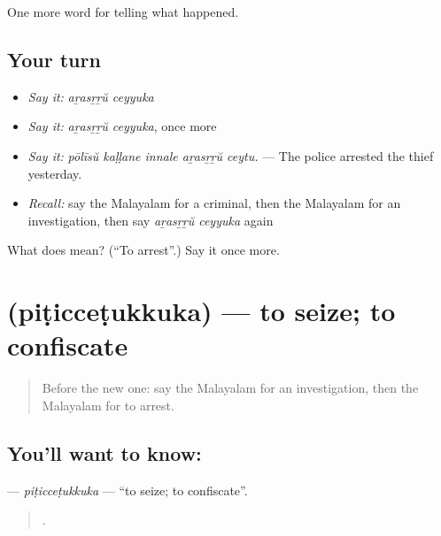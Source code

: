 \begin{grammarlens}[title={What you've built}]
One more word for telling what happened.
\end{grammarlens}

\subsection*{Your turn}
\begin{itemize}
\raggedright
  \item \emph{Say it:} \emph{aṟasṟṟŭ ceyyuka}
  \item \emph{Say it:} \emph{aṟasṟṟŭ ceyyuka}, once more
  \item \emph{Say it:} \emph{pōlīsŭ kaḷḷane innale aṟasṟṟŭ ceytu.} — The police arrested the thief yesterday.
  \item \emph{Recall:} say the Malayalam for a criminal, then the Malayalam for an investigation, then say \emph{aṟasṟṟŭ ceyyuka} again
\end{itemize}

\begin{tcolorbox}[breakable,colback=teal!4,colframe=teal!35!black,title={Before you move on}]
What does   mean? (\textquotedblleft{}To arrest\textquotedblright{}.) Say it once more.
\end{tcolorbox}
\section[\texorpdfstring{\ml{പിടിച്ചെടുക്കുക} (piṭicceṭukkuka)}{പിടിച്ചെടുക്കുക (piṭicceṭukkuka)}]{ (piṭicceṭukkuka) — to seize; to confiscate}

\label{lesson:ML-C365-piticcetukkuka}



\begin{quote}
Before the new one: say the Malayalam for an investigation, then the Malayalam for to arrest.
\end{quote}

\subsection*{You'll want to know: }
\textbf{} — \emph{piṭicceṭukkuka} — \textquotedblleft{}to seize; to confiscate\textquotedblright{}.

\begin{quote}
   .
\end{quote}

